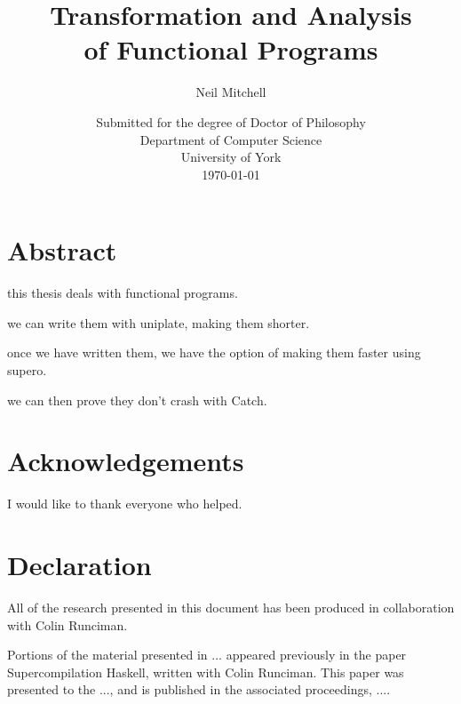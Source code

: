 
\title{Transformation and Analysis \\ of Functional Programs}
\author{Neil Mitchell}
\date{\normalsize{
    \vspace{20mm}
    Submitted for the degree of Doctor of Philosophy \\
    \vspace{10mm}
    Department of Computer Science \\
    University of York \\
    \today}}

\maketitle

\setcounter{page}{2}

\chapter*{Abstract}
this thesis deals with functional programs.

we can write them with uniplate, making them shorter.

once we have written them, we have the option of making them faster using supero.

we can then prove they don't crash with Catch.

\tableofcontents
\listoffigures
\listoftables

\chapter*{Acknowledgements}

I would like to thank everyone who helped.

\chapter*{Declaration}

All of the research presented in this document has been produced in collaboration with Colin Runciman.

Portions of the material presented in ... appeared previously in the paper Supercompilation Haskell, written with Colin Runciman. This paper was presented to the ..., and is published in the associated proceedings, ....

